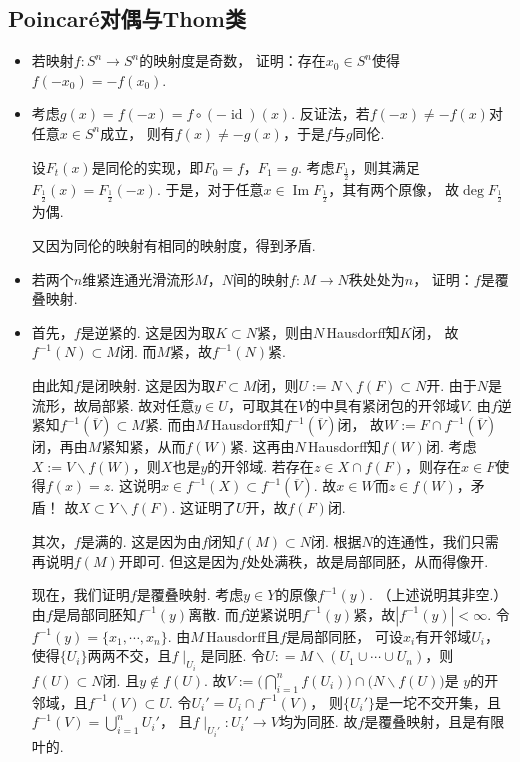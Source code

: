 \subsection{Poincaré对偶与Thom类}
\begin{itemize}
    \item[9.4] 若映射$f:S^{n} \to S^{n}$的映射度是奇数，
               证明：存在$x_{0} \in S^{n}$使得$f(-x_{0}) = -f(x_{0})$.
    \item[\textbf{证明：}]
        \qquad 考虑$g(x)=f(-x)=f\circ (-\operatorname{id}) (x)$. 
        反证法，若$f(-x)\neq -f(x)$对任意$x\in S^n$成立，
        则有$f(x)\neq -g(x)$，于是$f$与$g$同伦.\par
        \qquad 设$F_t(x)$是同伦的实现，即$F_0=f$，$F_1=g$. 
        考虑$F_{\frac{1}{2}}$，则其满足$F_{\frac{1}{2}}(x)=F_{\frac{1}{2}}(-x)$. 
        于是，对于任意$x\in \operatorname{Im}F_{\frac{1}{2}}$，其有两个原像，
        故$\deg F_{\frac{1}{2}}$为偶.\par
        \qquad 又因为同伦的映射有相同的映射度，得到矛盾.

    \item[9.5] 若两个$n$维紧连通光滑流形$M$，$N$间的映射$f:M \to N$秩处处为$n$，
               证明：$f$是覆叠映射.      
    \item[\textbf{证明：}]    
    首先，$f$是逆紧的. 这是因为取$K \subset N$紧，则由$N \,$Hausdorff知$K$闭，
    故$f^{-1}(N) \subset M$闭.
    而$M$紧，故$f^{-1}(N)$紧.

    由此知$f$是闭映射. 
    这是因为取$F \subset M$闭，则$U := N \backslash f(F) \subset N$开. 
    由于$N$是流形，故局部紧. 故对任意$y \in U$，可取其在$V$的中具有紧闭包的开邻域$V$.
    由$f$逆紧知$f^{-1}(\overline{V}) \subset M$紧. 
    而由$M \,$Hausdorff知$f^{-1}(\overline{V})$闭，
    故$W := F \cap f^{-1}(\overline{V})$闭，再由$M$紧知紧，从而$f(W)$紧.
    这再由$N \,$Hausdorff知$f(W)$闭. 
    考虑$X := V \backslash f(W)$，则$X$也是$y$的开邻域.
    若存在$z \in X \cap f(F)$，则存在$x \in F$使得$f(x) = z$.
    这说明$x \in f^{-1}(X) \subset f^{-1}(\overline{V})$. 
    故$x \in W$而$z \in f(W)$，矛盾！
    故$X \subset Y \backslash f(F)$. 这证明了$U$开，故$f(F)$闭.

    其次，$f$是满的. 这是因为由$f$闭知$f(M) \subset N$闭. 
    根据$N$的连通性，我们只需再说明$f(M)$开即可. 
    但这是因为$f$处处满秩，故是局部同胚，从而得像开.

    现在，我们证明$f$是覆叠映射. 考虑$y \in Y$的原像$f^{-1}(y)$. （上述说明其非空.）
    由$f$是局部同胚知$f^{-1}(y)$离散. 
    而$f$逆紧说明$f^{-1}(y)$紧，故$|f^{-1}(y)| < \infty$.
    令$f^{-1}(y) = \{x_{1},\cdots,x_{n}\}$. 由$M \,$Hausdorff且$f$是局部同胚，
    可设$x_{i}$有开邻域$U_{i}$，使得$\{U_{i}\}$两两不交，且$f\mid_{U_{i}}$是同胚.
    令$U: = M \backslash (U_{1} \cup \cdots \cup U_{n})$，则$f(U) \subset N$闭.
    且$y \notin f(U)$. 故$V := \Big(\bigcap\limits_{i=1}^{n}f(U_{i})\Big) \cap \big(N \backslash f(U)\big)$是
    $y$的开邻域，且$f^{-1}(V) \subset U$. 令$U_{i}' = U_{i} \cap f^{-1}(V)$，
    则$\{U_{i}'\}$是一坨不交开集，且$f^{-1}(V) = \bigcup\limits_{i=1}^{n}U_{i}'$，
    且$f\mid_{U_{i}'}:U_{i}' \to V$均为同胚.
    故$f$是覆叠映射，且是有限叶的. 
\end{itemize}

